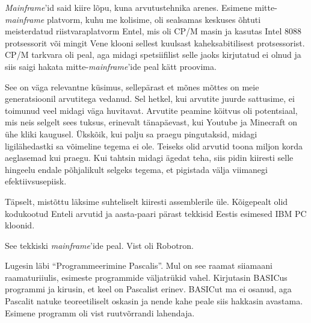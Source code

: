 \emph{Mainframe}'id said kiire lõpu, kuna arvutustehnika arenes. 
Esimene mitte-\emph{mainframe} platvorm, kuhu me kolisime, oli sealsamas 
keskuses õhtuti meisterdatud riistvaraplatvorm 
Entel, mis oli CP/M masin ja kasutas 
Intel 8088 protsessorit või mingit Vene klooni sellest kuulsast 
kaheksabitilisest protsessorist. CP/M tarkvara oli peal, aga midagi 
spetsiifilist selle jaoks kirjutatud ei olnud ja siis saigi 
hakata mitte-\emph{mainframe}'ide peal kätt proovima. 


See on väga relevantne küsimus, sellepärast et mõnes mõttes on meie 
generatsioonil arvutitega vedanud. Sel hetkel, kui arvutite juurde 
sattusime, ei toimunud veel midagi väga huvitavat. 
Arvutite peamine köitvus oli potentsiaal, mis neis selgelt sees tuksus, erinevalt tänapäevast,
kui Youtube ja Minecraft on ühe kliki kaugusel. Ükskõik, kui palju sa praegu
pingutaksid, midagi ligilähedastki sa võimeline tegema ei ole. Teiseks olid
arvutid toona miljon korda aeglasemad kui praegu. 
Kui tahtsin midagi ägedat teha, siis pidin kiiresti selle 
hingeelu endale põhjalikult selgeks tegema, et pigistada välja viimanegi 
efektiivsusepiisk.


Täpselt, mistõttu läksime suhteliselt kiiresti 
assemblerile üle. Kõigepealt olid kodukootud 
Enteli arvutid ja aasta-paari pärast tekkisid Eestis esimesed IBM PC 
kloonid. 


See tekkiski \emph{mainframe}'ide peal. Vist oli Robotron.


Lugesin läbi \enquote{Programmeerimine 
Pascalis}. 
Mul on see raamat siiamaani raamaturiiulis, esimeste programmide 
väljatrükid vahel. Kirjutasin 
BASICus programmi ja kirusin, et keel on Pascalist erinev. BASICut ma ei osanud, aga Pascalit natuke teoreetiliselt oskasin ja 
nende kahe peale siis hakkasin avastama. Esimene programm oli vist ruutvõrrandi 
lahendaja.

